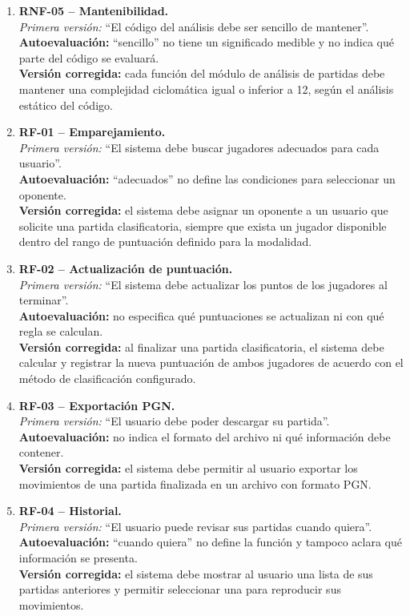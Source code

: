 \documentclass[12pt,a4paper]{article}
\begin{document}
\begin{enumerate}[leftmargin=*]
    \item \textbf{RNF-05 -- Mantenibilidad.}\\
    \textit{Primera versión:} ``El código del análisis debe ser sencillo de mantener''.\\
    \textbf{Autoevaluación:} ``sencillo'' no tiene un significado medible y no indica qué parte del código se evaluará.\\
    \textbf{Versión corregida:} cada función del módulo de análisis de partidas debe mantener una complejidad ciclomática igual o inferior a 12, según el análisis estático del código.

    \item \textbf{RF-01 -- Emparejamiento.}\\
    \textit{Primera versión:} ``El sistema debe buscar jugadores adecuados para cada usuario''.\\
    \textbf{Autoevaluación:} ``adecuados'' no define las condiciones para seleccionar un oponente.\\
    \textbf{Versión corregida:} el sistema debe asignar un oponente a un usuario que solicite una partida clasificatoria, siempre que exista un jugador disponible dentro del rango de puntuación definido para la modalidad.

    \item \textbf{RF-02 -- Actualización de puntuación.}\\
    \textit{Primera versión:} ``El sistema debe actualizar los puntos de los jugadores al terminar''.\\
    \textbf{Autoevaluación:} no especifica qué puntuaciones se actualizan ni con qué regla se calculan.\\
    \textbf{Versión corregida:} al finalizar una partida clasificatoria, el sistema debe calcular y registrar la nueva puntuación de ambos jugadores de acuerdo con el método de clasificación configurado.

    \item \textbf{RF-03 -- Exportación PGN.}\\
    \textit{Primera versión:} ``El usuario debe poder descargar su partida''.\\
    \textbf{Autoevaluación:} no indica el formato del archivo ni qué información debe contener.\\
    \textbf{Versión corregida:} el sistema debe permitir al usuario exportar los movimientos de una partida finalizada en un archivo con formato PGN.

    \item \textbf{RF-04 -- Historial.}\\
    \textit{Primera versión:} ``El usuario puede revisar sus partidas cuando quiera''.\\
    \textbf{Autoevaluación:} ``cuando quiera'' no define la función y tampoco aclara qué información se presenta.\\
    \textbf{Versión corregida:} el sistema debe mostrar al usuario una lista de sus partidas anteriores y permitir seleccionar una para reproducir sus movimientos.


\end{enumerate}
\end{document}
